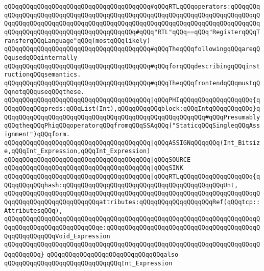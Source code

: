 \verb|qQQqqQQqqQQqqQQqqQQqqQQqqQQqqQQqqQQqqQQq#qQQqRTLqQQqoperators:qQQqqQQqqQQqqQQqqQQqqQQqqQQqqQQqqQQqqQQqqQQqqQQqqQQqqQQqqQQqqQQqqQQqqQQqqQQqqQQqqQQqqQQqqQQqqQQqqQQqqQQqqQQqqQQqqQQqqQQqqQQqqQQqqQQqqQQqqQQqqQQqqQQqqQQqqQQqqQQqqQQqqQQqqQQqqQQqqQQqqQQq#qQQq"RTL"qQQq==qQQq"RegisterqQQqTransferqQQqLanguage"qQQq(mostqQQqlikely)|\newline
\verb|qQQqqQQqqQQqqQQqqQQqqQQqqQQqqQQqqQQqqQQq#qQQqTheqQQqfollowingqQQqareqQQqusedqQQqinternally|\newline
\verb|qQQqqQQqqQQqqQQqqQQqqQQqqQQqqQQqqQQqqQQq#qQQqforqQQqdescribingqQQqinstructionqQQqsemantics.|\newline
\verb|qQQqqQQqqQQqqQQqqQQqqQQqqQQqqQQqqQQqqQQq#qQQqTheqQQqfrontendqQQqmustqQQqnotqQQquseqQQqthese.|\newline
\newline
\verb|qQQqqQQqqQQqqQQqqQQqqQQqqQQqqQQqqQQqqQQq|\verb#|qQQqPHIqQQqqQQqqQQqqQQqqQQq{qQQqqQQqqQQqpreds:qQQqList(Int),qQQqqQQqqQQqblock:qQQqIntqQQqqQQqqQQq}qQQqqQQqqQQqqQQqqQQqqQQqqQQqqQQqqQQqqQQqqQQqqQQqqQQqqQQq#\verb|#qQQqPresumablyqQQqtheqQQqPhiqQQqoperatorqQQqfromqQQqSSAqQQq("StaticqQQqSingleqQQqAssignment")qQQqform.|\newline
\verb|qQQqqQQqqQQqqQQqqQQqqQQqqQQqqQQqqQQqqQQq|\verb#|qQQqASSIGNqQQqqQQq(Int_Bitsize,qQQqInt_Expression,qQQqInt_Expression)#\newline
\verb|qQQqqQQqqQQqqQQqqQQqqQQqqQQqqQQqqQQqqQQq|\verb#|qQQqSOURCE#\newline
\verb|qQQqqQQqqQQqqQQqqQQqqQQqqQQqqQQqqQQqqQQq|\verb#|qQQqSINK#\newline
\verb|qQQqqQQqqQQqqQQqqQQqqQQqqQQqqQQqqQQqqQQq|\verb#|qQQqRTLqQQqqQQqqQQqqQQqqQQq{qQQqqQQqqQQqhash:qQQqqQQqqQQqqQQqqQQqqQQqqQQqqQQqqQQqqQQqqQQqUnt,#\newline
\verb|qQQqqQQqqQQqqQQqqQQqqQQqqQQqqQQqqQQqqQQqqQQqqQQqqQQqqQQqqQQqqQQqqQQqqQQqqQQqqQQqqQQqqQQqqQQqqQQqattributes:qQQqqQQqqQQqqQQqqQQqRef(qQQqtcp::AttributesqQQq),|\newline
\verb|qQQqqQQqqQQqqQQqqQQqqQQqqQQqqQQqqQQqqQQqqQQqqQQqqQQqqQQqqQQqqQQqqQQqqQQqqQQqqQQqqQQqqQQqqQQqqQQqe:qQQqqQQqqQQqqQQqqQQqqQQqqQQqqQQqqQQqqQQqqQQqqQQqqQQqqQQqVoid_Expression|\newline
\verb|qQQqqQQqqQQqqQQqqQQqqQQqqQQqqQQqqQQqqQQqqQQqqQQqqQQqqQQqqQQqqQQqqQQqqQQqqQQqqQQq}|\newline
\newline
\verb|qQQqqQQqqQQqqQQqqQQqqQQqqQQqqQQqalso|\newline
\verb|qQQqqQQqqQQqqQQqqQQqqQQqqQQqqQQqInt_Expression|\newline
